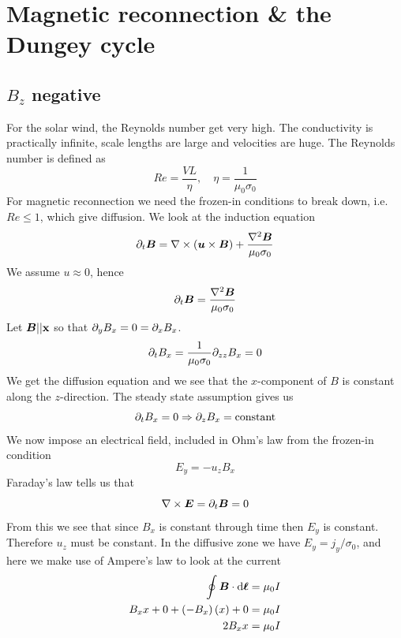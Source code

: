 \section{Magnetic reconnection \& the Dungey cycle}
\subsection{\(B_z\) negative}
For the solar wind, the Reynolds number get very high. The conductivity is practically infinite, scale lengths are large and velocities are huge. The Reynolds number is defined as
\begin{equation*}
    Re=\frac{VL}{\eta},\quad\eta=\frac{1}{\mu_0\sigma_0}
\end{equation*}
For magnetic reconnection we need the frozen-in conditions to break down, i.e.~\(Re\leq 1\), which give diffusion. We look at the induction equation
\begin{equation*}
    \partial_{t}\boldsymbol{B}=\nabla\times\left(\boldsymbol{u}\times\boldsymbol{B}\right)+\frac{\nabla^2\boldsymbol{B}}{\mu_0\sigma_0}
\end{equation*}
We assume \(u\approx 0\), hence
\begin{equation*}
    \partial_{t}\boldsymbol{B}=\frac{\nabla^2\boldsymbol{B}}{\mu_0\sigma_0}
\end{equation*}
Let \(\boldsymbol{B}||\mathbf{x}\) so that \(\partial_{y}B_x=0=\partial_{x}B_x\).
\begin{equation*}
    \partial_{t}B_x=\frac{1}{\mu_0\sigma_0}\partial_{zz}B_x=0
\end{equation*}
We get the diffusion equation and we see that the \(x\)-component of \(B\) is constant along the \(z\)-direction. The steady state assumption gives us
\begin{equation*}
    \partial_{t}B_x=0\Rightarrow\partial_{z}B_x=\textnormal{constant}
\end{equation*}
We now impose an electrical field, included in Ohm's law from the frozen-in condition
\begin{equation*}
    E_y=-u_{z}B_x
\end{equation*}
Faraday's law tells us that
\begin{equation*}
    \nabla\times\boldsymbol{E}=\partial_{t}\boldsymbol{B}=0
\end{equation*}
From this we see that since \(B_x\) is constant through time then \(E_y\) is constant. Therefore \(u_z\) must be constant. In the diffusive zone we have \(E_y=j_y/\sigma_0\), and here we make use of Ampere's law to look at the current
\begin{align*}
    \oint\boldsymbol{B}\cdot\textnormal{d}\boldsymbol{\ell}&=\mu_0 I\\
    B_{x}x+0+\left(-B_x\right)\left(x\right)+0&=\mu_0 I\\
    2B_{x}x&=\mu_0 I
\end{align*}
